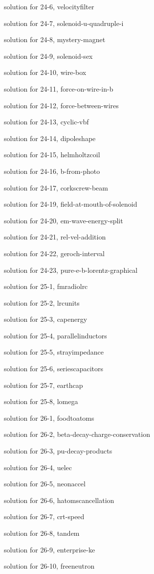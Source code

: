 \documentclass{problems}
\begin{document}
solution for 24-6, velocityfilter

solution for 24-7, solenoid-u-quadruple-i

solution for 24-8, mystery-magnet

solution for 24-9, solenoid-sex

solution for 24-10, wire-box

solution for 24-11, force-on-wire-in-b

solution for 24-12, force-between-wires

solution for 24-13, cyclic-vbf

solution for 24-14, dipoleshape

solution for 24-15, helmholtzcoil

solution for 24-16, b-from-photo

solution for 24-17, corkscrew-beam

solution for 24-19, field-at-mouth-of-solenoid

solution for 24-20, em-wave-energy-split

solution for 24-21, rel-vel-addition

solution for 24-22, geroch-interval

solution for 24-23, pure-e-b-lorentz-graphical

solution for 25-1, fmradiolrc

solution for 25-2, lrcunits

solution for 25-3, capenergy

solution for 25-4, parallelinductors

solution for 25-5, strayimpedance

solution for 25-6, seriescapacitors

solution for 25-7, earthcap

solution for 25-8, lomega

solution for 26-1, foodtoatoms

solution for 26-2, beta-decay-charge-conservation

solution for 26-3, pu-decay-products

solution for 26-4, uelec

solution for 26-5, neonaccel

solution for 26-6, hatomscancellation

solution for 26-7, crt-speed

solution for 26-8, tandem

solution for 26-9, enterprise-ke

solution for 26-10, freeneutron
\end{document}
